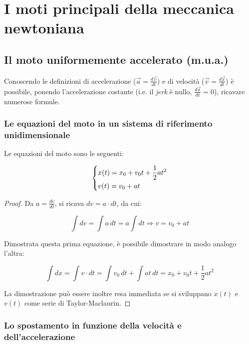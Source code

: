 \chapter{I moti principali della meccanica newtoniana}

\section{Il moto uniformemente accelerato (m.u.a.)}

Conoscendo le definizioni di accelerazione ($\vec{a} = \frac{d\vec{v}}{dt}$)
e di velocità ($\vec{v} = \frac{d\vec{x}}{dt}$) è possibile, ponendo l'accelerazione
costante (i.e. il \textit{jerk} è nullo, $\frac{d\vec{a}}{dt} = 0$), ricavare numerose formule.

\subsection{Le equazioni del moto in un sistema di riferimento unidimensionale}

Le equazioni del moto sono le seguenti:

\begin{equation}
    \begin{dcases}
        x(t)=x_0+v_0t+\frac{1}{2}at^2 \\
        v(t)=v_0+at
    \end{dcases}
    \label{eq:mua}
\end{equation}

\begin{proof}
    Da $a=\frac{dv}{dt}$, si ricava $dv=a\cdot dt$, da cui:

    \begin{equation*}
        \int dv=\int a\, dt = a \int dt \Rightarrow v=v_0+at
    \end{equation*}

    Dimostrata questa prima equazione, è possibile dimostrare in modo analogo l'altra:

    \begin{equation*}
        \int dx=\int v\cdot dt = \int v_0\, dt + \int at\, dt = x_0+v_0t+\frac12at^2
    \end{equation*}

    La dimostrazione può essere inoltre resa immediata se si sviluppano $x(t)$ e
    $v(t)$ come serie di Taylor-Maclaurin.

\end{proof}

\subsection{Lo spostamento in funzione della velocità e dell'accelerazione}

